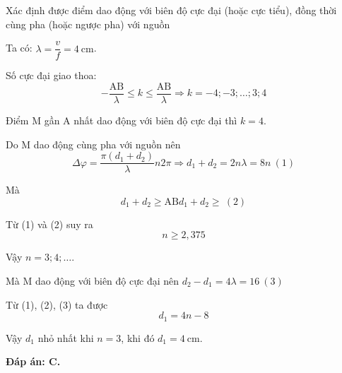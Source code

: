 \begin{dang}{Xác định được điểm dao động với biên độ cực đại (hoặc cực tiểu), đồng thời\\ cùng pha (hoặc ngược pha) với nguồn}
{		Ta có: $\lambda=\dfrac{v}{f}=4\ \text{cm}$.
		
		Số cực đại giao thoa:
		$$-\dfrac{\text{AB}}{\lambda}\leq k \leq \dfrac{\text{AB}}{\lambda} \Rightarrow k = -4; -3; \ldots ; 3; 4$$
		
		Điểm M gần A nhất dao động với biên độ cực đại thì $k=4$.
		
		Do M dao động cùng pha với nguồn nên
		$$\Delta \varphi = \dfrac{\pi (d_1 + d_2)}{\lambda} n 2 \pi \Rightarrow d_1 + d_2 = 2n\lambda = 8n\ (1)$$
		
		Mà $$d_1 + d_2 \geq \text{AB} d_1 + d_2 \geq\ (2)$$
		
		Từ (1) và (2) suy ra $$n \geq 2,375$$
		
		Vậy $n=3; 4; \ldots$.
		
		Mà M dao động với biên độ cực đại nên $d_2 - d_1=4\lambda = 16\ (3)$
		
		Từ (1), (2), (3) ta được
		$$d_1 = 4n - 8$$
		
		Vậy $d_1$ nhỏ nhất khi $n=3$, khi đó $d_1 = 4\ \text{cm}$.
		
		\textbf{Đáp án: C.}
	}
\end{dang}